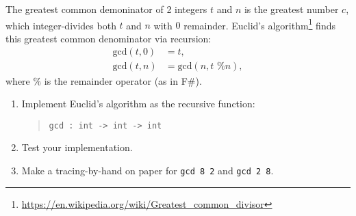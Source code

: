 \label{gcd} The greatest common demoninator of 2 integers $t$ and $n$
is the greatest number $c$, which integer-divides both $t$ and $n$
with $0$ remainder. Euclid's
algorithm\footnote{\url{https://en.wikipedia.org/wiki/Greatest_common_divisor}}
finds this greatest common denominator via recursion:
  \begin{align}
    \text{gcd}(t,0) &= t, \label{gcd:1}
    \\ \text{gcd}(t,n) &= \text{gcd}(n, t \text{ \% } n), \label{gcd:2}
  \end{align}
where $\%$ is the remainder operator (as in F\#). 
\begin{enumerate}
\item Implement Euclid's algorithm as the recursive function:
  \begin{quote}
    \lstinline{gcd : int -> int -> int}
  \end{quote}
\item Test your implementation.
\item Make a tracing-by-hand on paper for \lstinline{gcd 8 2} and \lstinline{gcd 2 8}.
\end{enumerate}
